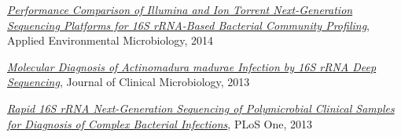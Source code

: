 \documentclass{res}
\begin{document}
\begin{resume}
\begin{thebibliography}{4}
    \href{http://aem.asm.org/content/80/24/7583}
         {\textit{Performance Comparison of Illumina and Ion Torrent 
                  Next-Generation Sequencing Platforms for 16S rRNA-Based 
                  Bacterial Community Profiling}},
         Applied Environmental Microbiology, 2014

    \href{http://jcm.asm.org/content/51/12/4262}
         {\textit{Molecular Diagnosis of Actinomadura madurae 
                  Infection by 16S rRNA Deep Sequencing}},
         Journal of Clinical Microbiology, 2013

    \href{http://journals.plos.org/plosone/article?id=10.1371/journal.pone.0065226}
         {\textit{Rapid 16S rRNA Next-Generation Sequencing of Polymicrobial 
                  Clinical Samples for Diagnosis of Complex Bacterial Infections}},
         PLoS One, 2013
\end{thebibliography}
\nocite{*}

\end{resume}
\end{document}
